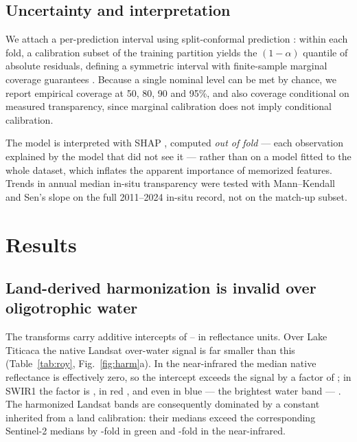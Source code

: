 \documentclass[preprint,review,12pt,authoryear]{elsarticle}
\begin{document}
\subsection{Uncertainty and interpretation}

We attach a per-prediction interval using split-conformal prediction
\citep{Angelopoulos2023}: within each fold, a calibration subset of the
training partition yields the $(1-\alpha)$ quantile of absolute residuals,
defining a symmetric interval with finite-sample marginal coverage guarantees
\citep{Romano2019}. Because a single nominal level can be met by chance, we
report empirical coverage at 50, 80, 90 and 95\%, and also coverage
conditional on measured transparency, since marginal calibration does not
imply conditional calibration.

The model is interpreted with SHAP \citep{Lundberg2017,Lundberg2020},
computed \emph{out of fold} --- each observation explained by the model that
did not see it --- rather than on a model fitted to the whole dataset, which
inflates the apparent importance of memorized features. Trends in annual
median in-situ transparency were tested with Mann--Kendall and Sen's slope
\citep{Mann1945,Sen1968} on the full 2011--2024 in-situ record, not on the
match-up subset.

\section{Results}\label{sec:results}

\subsection{Land-derived harmonization is invalid over oligotrophic
water}\label{sec:harm}

The \citet{Roy2016} transforms carry additive intercepts of
\numRoyInterceptMin--\numRoyInterceptMax{} in reflectance units. Over Lake
Titicaca the native Landsat over-water signal is far smaller than this
(Table~\ref{tab:roy}, Fig.~\ref{fig:harm}a). In the near-infrared the median
native reflectance is effectively zero, so the intercept exceeds the signal
by a factor of \numRoyRatioNir; in SWIR1 the factor is \numRoyRatioSwirOne,
in red \numRoyRatioRed, and even in blue --- the brightest water band ---
\numRoyRatioBlue. The harmonized Landsat bands are consequently dominated by
a constant inherited from a land calibration: their medians exceed the
corresponding Sentinel-2 medians by \numLsOverSTwoGreen-fold in green and
\numLsOverSTwoNir-fold in the near-infrared.
\end{document}
